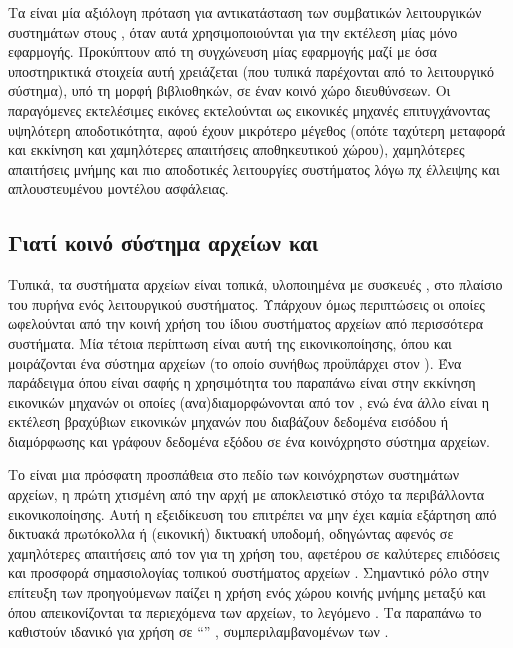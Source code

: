 Τα  είναι μία αξιόλογη πρόταση για αντικατάσταση των συμβατικών
λειτουργικών συστημάτων στους , όταν αυτά χρησιμοποιούνται για την
εκτέλεση μίας μόνο εφαρμογής. Προκύπτουν από τη συγχώνευση μίας εφαρμογής μαζί
με όσα υποστηρικτικά στοιχεία αυτή χρειάζεται (που τυπικά παρέχονται από το
λειτουργικό σύστημα), υπό τη μορφή βιβλιοθηκών, σε έναν κοινό χώρο διευθύνσεων.
Οι παραγόμενες εκτελέσιμες εικόνες εκτελούνται ως εικονικές μηχανές
επιτυγχάνοντας υψηλότερη αποδοτικότητα, αφού έχουν μικρότερο μέγεθος (οπότε
ταχύτερη μεταφορά και εκκίνηση \cite{jitsu} και χαμηλότερες απαιτήσεις
αποθηκευτικού χώρου), χαμηλότερες απαιτήσεις μνήμης και πιο αποδοτικές
λειτουργίες συστήματος λόγω πχ έλλειψης  και απλουστευμένου
μοντέλου ασφάλειας.

\subsection{Γιατί κοινό σύστημα αρχείων και \viofs{}}

Τυπικά, τα συστήματα αρχείων είναι τοπικά, υλοποιημένα με συσκευές ,
στο πλαίσιο του πυρήνα ενός λειτουργικού συστήματος. Υπάρχουν όμως περιπτώσεις
οι οποίες ωφελούνται από την κοινή χρήση του ίδιου συστήματος αρχείων από
περισσότερα συστήματα. Μία τέτοια περίπτωση είναι αυτή της εικονικοποίησης, όπου
\host{} και \guest{} μοιράζονται ένα σύστημα αρχείων (το οποίο συνήθως
προϋπάρχει στον \host{}). Ένα παράδειγμα όπου είναι σαφής η χρησιμότητα του
παραπάνω είναι στην εκκίνηση εικονικών μηχανών οι οποίες (ανα)διαμορφώνονται από
τον \host{}, ενώ ένα άλλο είναι η εκτέλεση βραχύβιων εικονικών μηχανών που
διαβάζουν δεδομένα εισόδου ή διαμόρφωσης και γράφουν δεδομένα εξόδου σε ένα
κοινόχρηστο σύστημα αρχείων.

Το \viofs{} είναι μια πρόσφατη προσπάθεια στο πεδίο των κοινόχρηστων συστημάτων
αρχείων, η πρώτη χτισμένη από την αρχή με αποκλειστικό στόχο τα περιβάλλοντα
εικονικοποίησης. Αυτή η εξειδίκευση του επιτρέπει να μην έχει καμία εξάρτηση
από δικτυακά πρωτόκολλα ή (εικονική) δικτυακή υποδομή, οδηγώντας αφενός σε
χαμηλότερες απαιτήσεις από τον \guest{} για τη χρήση του, αφετέρου σε καλύτερες
επιδόσεις και προσφορά σημασιολογίας τοπικού συστήματος αρχείων
\cite{virtiofs-website}. Σημαντικό ρόλο στην επίτευξη των προηγούμενων παίζει η
χρήση ενός χώρου κοινής μνήμης μεταξύ \host{} και \guest{} όπου απεικονίζονται
τα περιεχόμενα των αρχείων, το λεγόμενο . Τα
παραπάνω το καθιστούν ιδανικό για χρήση σε ``'' ,
συμπεριλαμβανομένων των .

